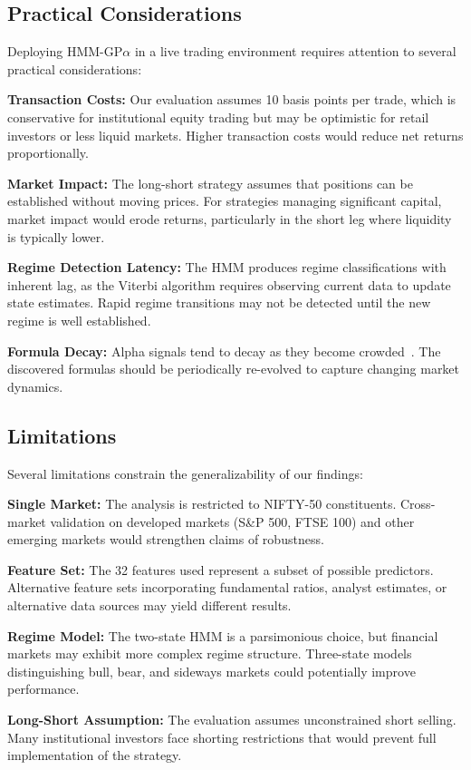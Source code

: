 \documentclass{ieeeaccess}
\begin{document}
\subsection{Practical Considerations}
Deploying HMM-GP$\alpha$ in a live trading environment requires attention to several practical considerations:

\textbf{Transaction Costs:} Our evaluation assumes 10 basis points per trade, which is conservative for institutional equity trading but may be optimistic for retail investors or less liquid markets. Higher transaction costs would reduce net returns proportionally.

\textbf{Market Impact:} The long-short strategy assumes that positions can be established without moving prices. For strategies managing significant capital, market impact would erode returns, particularly in the short leg where liquidity is typically lower.

\textbf{Regime Detection Latency:} The HMM produces regime classifications with inherent lag, as the Viterbi algorithm requires observing current data to update state estimates. Rapid regime transitions may not be detected until the new regime is well established.

\textbf{Formula Decay:} Alpha signals tend to decay as they become crowded~\cite{b3}. The discovered formulas should be periodically re-evolved to capture changing market dynamics.

\subsection{Limitations}
Several limitations constrain the generalizability of our findings:

\textbf{Single Market:} The analysis is restricted to NIFTY-50 constituents. Cross-market validation on developed markets (S\&P 500, FTSE 100) and other emerging markets would strengthen claims of robustness.

\textbf{Feature Set:} The 32 features used represent a subset of possible predictors. Alternative feature sets incorporating fundamental ratios, analyst estimates, or alternative data sources may yield different results.

\textbf{Regime Model:} The two-state HMM is a parsimonious choice, but financial markets may exhibit more complex regime structure. Three-state models distinguishing bull, bear, and sideways markets could potentially improve performance.

\textbf{Long-Short Assumption:} The evaluation assumes unconstrained short selling. Many institutional investors face shorting restrictions that would prevent full implementation of the strategy.
\end{document}
